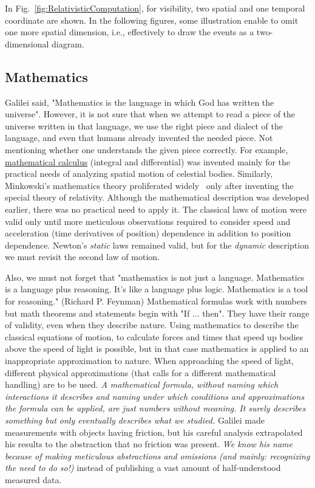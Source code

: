 In Fig.~\ref{fig:RelativisticComputation}, for visibility, two spatial
and one temporal coordinate are shown. In the following figures,
some illustration enable to omit one more spatial dimension, i.e., 
effectively to draw the events as a two-dimensional diagram.




\subsection{Mathematics\label{sec:Physics-Mathematics}}


Galilei said, "Mathematics is the language in which God has written
the universe". However, it is not sure that when we attempt to read
a piece of the universe written in that language, we use the right
piece and dialect of the language, and even that humans already invented the
needed piece. Not mentioning whether one understands the
given piece correctly.  
For example,  \href{https://en.wikipedia.org/wiki/Calculus} {mathematical calculus}
(integral and differential) was invented mainly for the practical needs of analyzing spatial motion of celestial bodies.
Similarly, Minkowski's mathematics theory proliferated widely~ \cite{EinsteinMinkowskiRelativity:1977}
only after inventing the special theory of relativity.
Although the mathematical description was developed earlier, there was no practical
need to apply it.
The classical laws of motion were valid only until more meticulous observations required
to consider speed and acceleration (time derivatives of position) dependence in addition to position dependence.
Newton's \textit{static} laws remained valid, but for the \textit{dynamic} description we must revisit the second law of motion. 

Also, we must not forget that "mathematics is not just a language. Mathematics is a language plus reasoning. It's like a language plus logic. Mathematics is a tool for reasoning." (Richard P. Feynman)
Mathematical formulas work with numbers but math theorems and statements begin with "If ... then".
They have their range of validity, even when they describe nature.
Using mathematics to describe the classical equations of motion,
to calculate forces and times that speed up bodies
above the speed of light is possible, but in that case mathematics is applied to
an inappropriate approximation to nature. When approaching the speed of light,
different physical approximations (that calls for a different mathematical handling) are to be used.
\textit{A mathematical formula, without naming which interactions it describes
 and naming
under which conditions and approximations the formula can be applied, are just numbers without meaning.
It surely describes something but only eventually describes what we studied.}
Galilei made measurements with objects having friction, but his careful analysis
extrapolated his results to the abstraction that no friction was present.
\textit{We know his name because of making meticulous abstractions and omissions (and mainly:
recognizing the need to do so!)} instead of publishing a vast amount of
half-understood measured data.


